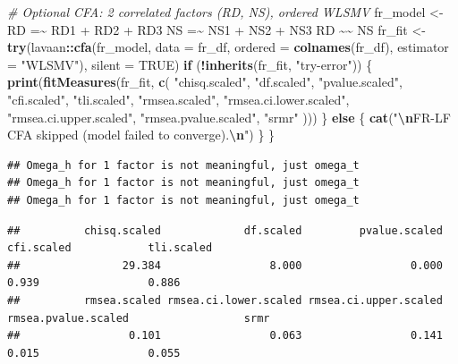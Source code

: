 \documentclass[
  10pt,
]{article}
\newenvironment{Shaded}{\begin{snugshade}}{\end{snugshade}}
\newcommand{\AttributeTok}[1]{\textcolor[rgb]{0.13,0.29,0.53}{#1}}
\newcommand{\CommentTok}[1]{\textcolor[rgb]{0.56,0.35,0.01}{\textit{#1}}}
\newcommand{\ConstantTok}[1]{\textcolor[rgb]{0.56,0.35,0.01}{#1}}
\newcommand{\ControlFlowTok}[1]{\textcolor[rgb]{0.13,0.29,0.53}{\textbf{#1}}}
\newcommand{\FunctionTok}[1]{\textcolor[rgb]{0.13,0.29,0.53}{\textbf{#1}}}
\newcommand{\NormalTok}[1]{#1}
\newcommand{\OtherTok}[1]{\textcolor[rgb]{0.56,0.35,0.01}{#1}}
\newcommand{\SpecialCharTok}[1]{\textcolor[rgb]{0.81,0.36,0.00}{\textbf{#1}}}
\newcommand{\StringTok}[1]{\textcolor[rgb]{0.31,0.60,0.02}{#1}}
\begin{document}
\begin{Shaded}
\begin{Highlighting}[]
  \CommentTok{\# Optional CFA: 2 correlated factors (RD, NS), ordered WLSMV}
\NormalTok{  fr\_model }\OtherTok{\textless{}{-}} \StringTok{\textquotesingle{}}
\StringTok{  RD =\textasciitilde{} RD1 + RD2 + RD3}
\StringTok{  NS =\textasciitilde{} NS1 + NS2 + NS3}
\StringTok{  RD \textasciitilde{}\textasciitilde{} NS}
\StringTok{  \textquotesingle{}}
\NormalTok{  fr\_fit }\OtherTok{\textless{}{-}} \FunctionTok{try}\NormalTok{(lavaan}\SpecialCharTok{::}\FunctionTok{cfa}\NormalTok{(fr\_model, }\AttributeTok{data =}\NormalTok{ fr\_df, }\AttributeTok{ordered =} \FunctionTok{colnames}\NormalTok{(fr\_df), }\AttributeTok{estimator =} \StringTok{"WLSMV"}\NormalTok{), }\AttributeTok{silent =} \ConstantTok{TRUE}\NormalTok{)}
  \ControlFlowTok{if}\NormalTok{ (}\SpecialCharTok{!}\FunctionTok{inherits}\NormalTok{(fr\_fit, }\StringTok{"try{-}error"}\NormalTok{)) \{}
    \FunctionTok{print}\NormalTok{(}\FunctionTok{fitMeasures}\NormalTok{(fr\_fit, }\FunctionTok{c}\NormalTok{(}
      \StringTok{"chisq.scaled"}\NormalTok{, }\StringTok{"df.scaled"}\NormalTok{, }\StringTok{"pvalue.scaled"}\NormalTok{, }\StringTok{"cfi.scaled"}\NormalTok{,}
      \StringTok{"tli.scaled"}\NormalTok{, }\StringTok{"rmsea.scaled"}\NormalTok{, }\StringTok{"rmsea.ci.lower.scaled"}\NormalTok{,}
      \StringTok{"rmsea.ci.upper.scaled"}\NormalTok{, }\StringTok{"rmsea.pvalue.scaled"}\NormalTok{, }\StringTok{"srmr"}
\NormalTok{    )))}
\NormalTok{  \} }\ControlFlowTok{else}\NormalTok{ \{}
    \FunctionTok{cat}\NormalTok{(}\StringTok{"}\SpecialCharTok{\textbackslash{}n}\StringTok{FR{-}LF CFA skipped (model failed to converge).}\SpecialCharTok{\textbackslash{}n}\StringTok{"}\NormalTok{)}
\NormalTok{  \}}
\NormalTok{\}}
\end{Highlighting}
\end{Shaded}

\begin{verbatim}
## Omega_h for 1 factor is not meaningful, just omega_t
## Omega_h for 1 factor is not meaningful, just omega_t
## Omega_h for 1 factor is not meaningful, just omega_t
\end{verbatim}

\begin{verbatim}
##          chisq.scaled             df.scaled         pvalue.scaled            cfi.scaled            tli.scaled
##                29.384                 8.000                 0.000                 0.939                 0.886
##          rmsea.scaled rmsea.ci.lower.scaled rmsea.ci.upper.scaled   rmsea.pvalue.scaled                  srmr
##                 0.101                 0.063                 0.141                 0.015                 0.055
\end{verbatim}
\end{document}

